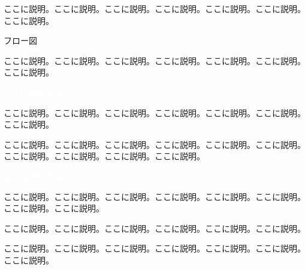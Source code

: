 \documentclass[a4paper, 14pt, dvipdfmx, fleqn]{jsarticle}
\begin{document}
    \vspace{3mm}

    \noindent
    {\Large ここに説明。ここに説明。ここに説明。ここに説明。ここに説明。ここに説明。ここに説明。}

    \vspace{1.5cm}

    \begin{tcolorbox}
        \vspace{8.25cm}
        \hfill {\Large フロー図} \hfill
        \vspace{8.25cm}
    \end{tcolorbox}

    \hfill
    {\large ここに説明。ここに説明。ここに説明。ここに説明。ここに説明。ここに説明。ここに説明。}

    \newpage

    \begin{tcolorbox}[
        colback=myBlue,
        colframe=myBlue,
        sharpish corners]
        {\huge \bf \textcolor{white}{ここにタイトル}}
    \end{tcolorbox}

    \noindent
    {\Large ここに説明。ここに説明。ここに説明。ここに説明。ここに説明。ここに説明。ここに説明。}

    \noindent
    {\Large ここに説明。ここに説明。ここに説明。ここに説明。ここに説明。ここに説明。
    ここに説明。ここに説明。ここに説明。ここに説明。}

    \vspace{1cm}

    \begin{tcolorbox}[
        colback=myBlue,
        colframe=myBlue,
        sharpish corners]
        {\huge \bf \textcolor{white}{ここにタイトル}}
    \end{tcolorbox}

    {\Large ここに説明。ここに説明。ここに説明。ここに説明。ここに説明。ここに説明。ここに説明。ここに説明。}

    \vspace{3mm}

    \noindent
    {\Large ここに説明。ここに説明。ここに説明。ここに説明。ここに説明。ここに説明。}

    \noindent
    {\large ここに説明。ここに説明。ここに説明。ここに説明。ここに説明。ここに説明。ここに説明。}
\end{document}
